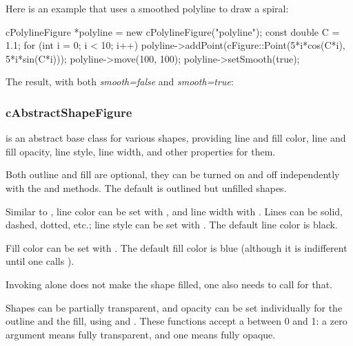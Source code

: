 Here is an example that uses a smoothed polyline to draw a spiral:

\begin{cpp}
cPolylineFigure *polyline = new cPolylineFigure("polyline");
const double C = 1.1;
for (int i = 0; i < 10; i++)
    polyline->addPoint(cFigure::Point(5*i*cos(C*i), 5*i*sin(C*i)));
polyline->move(100, 100);
polyline->setSmooth(true);
\end{cpp}


The result, with both \textit{smooth=false} and \textit{smooth=true}:

\begin{center}

\end{center}


\subsubsection{cAbstractShapeFigure}
\label{sec:graphics:abstractshapefigure}

 is an abstract base class for various shapes,
providing line and fill color, line and fill opacity, line style, line
width, and other properties for them.

Both outline and fill are optional, they can be turned on and off
independently with the  and 
methods. The default is outlined but unfilled shapes.

Similar to , line color can be set with
, and line width with .
Lines can be solid, dashed, dotted, etc.; line style can be set with
. The default line color is black.

Fill color can be set with . The default fill color
is blue (although it is indifferent until one calls ).

\begin{note}
Invoking  alone does not make the shape filled,
one also needs to call  for that.
\end{note}

Shapes can be partially transparent, and opacity can be set individually
for the outline and the fill, using  and
. These functions accept a  between 0
and 1: a zero argument means fully transparent, and one means fully opaque.

